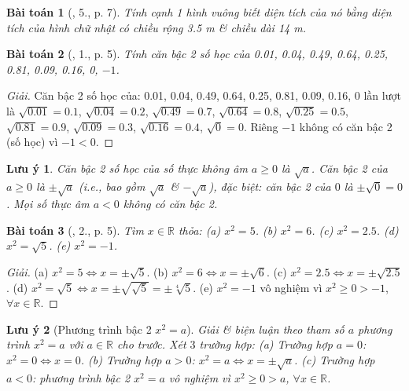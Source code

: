 \documentclass{article}
\newtheorem{baitoan}{Bài toán}
\newtheorem{luuy}{Lưu ý}
\begin{document}
\begin{baitoan}[\cite{SGK_Toan_9_tap_1}, 5., p. 7]
	Tính cạnh 1 hình vuông biết diện tích của nó bằng diện tích của hình chữ nhật có chiều rộng \emph{3.5 m} \& chiều dài \emph{14 m}.
\end{baitoan}

\begin{baitoan}[\cite{SBT_Toan_9_tap_1}, 1., p. 5]
	Tính căn bậc 2 số học của \emph{0.01, 0.04, 0.49, 0.64, 0.25, 0.81, 0.09, 0.16, 0, $-1$.}
\end{baitoan}

\begin{proof}[Giải]
	Căn bậc 2 số học của: 0.01, 0.04, 0.49, 0.64, 0.25, 0.81, 0.09, 0.16, 0 lần lượt là $\sqrt{0.01} = 0.1$, $\sqrt{0.04} = 0.2$, $\sqrt{0.49} = 0.7$, $\sqrt{0.64} = 0.8$, $\sqrt{0.25} = 0.5$, $\sqrt{0.81} = 0.9$, $\sqrt{0.09} = 0.3$, $\sqrt{0.16} = 0.4$, $\sqrt{0} = 0$. Riêng $-1$ không có căn bậc 2 (số học) vì $-1 < 0$.
\end{proof}

\begin{luuy}
	Căn bậc 2 số học của số thực không âm $a\ge0$ là $\sqrt{a}$. Căn bậc 2 của $a\ge0$ là $\pm\sqrt{a}$ (i.e., bao gồm $\sqrt{a}$ \& $-\sqrt{a}$), đặc biệt: căn bậc 2 của $0$ là $\pm\sqrt{0} = 0$. Mọi số thực âm $a < 0$ không có căn bậc 2. 
\end{luuy}

\begin{baitoan}[\cite{SBT_Toan_9_tap_1}, 2., p. 5]
	Tìm $x\in\mathbb{R}$ thỏa: (a) $x^2 = 5$. (b) $x^2 = 6$. (c) $x^2 = 2.5$. (d) $x^2 = \sqrt{5}$. (e) $x^2 = -1$.
\end{baitoan}

\begin{proof}[Giải]
	(a) $x^2 = 5\Leftrightarrow x = \pm\sqrt{5}$. (b) $x^2 = 6\Leftrightarrow x = \pm\sqrt{6}$. (c) $x^2 = 2.5\Leftrightarrow x = \pm\sqrt{2.5}$. (d) $x^2 = \sqrt{5}\Leftrightarrow x = \pm\sqrt{\sqrt{5}} = \pm\sqrt[4]{5}$. (e) $x^2 = -1$ vô nghiệm vì $x^2\ge0 > -1$, $\forall x\in\mathbb{R}$.
\end{proof}

\begin{luuy}[Phương trình bậc 2 $x^2 = a$]
	Giải \& biện luận theo tham số $a$ phương trình $x^2 = a$ với $a\in\mathbb{R}$ cho trước. Xét $3$ trường hợp: (a) Trường hợp $a = 0$: $x^2 = 0\Leftrightarrow x = 0$. (b) Trường hợp $a > 0$: $x^2 = a\Leftrightarrow x = \pm\sqrt{a}$. (c) Trường hợp $a < 0$: phương trình bậc 2 $x^2 = a$ vô nghiệm vì $x^2\ge0 > a$, $\forall x\in\mathbb{R}$.
\end{luuy}
\end{document}
